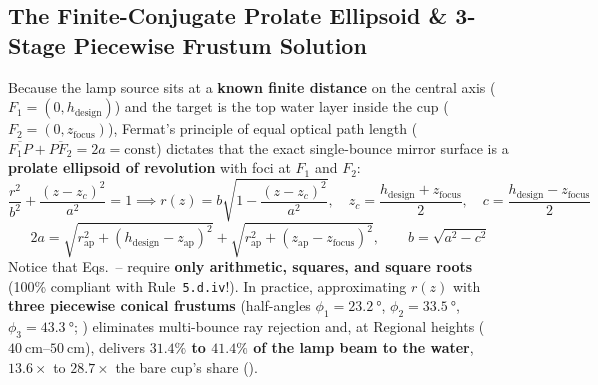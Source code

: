 \subsection{The Finite-Conjugate Prolate Ellipsoid \& 3-Stage Piecewise Frustum Solution}
Because the lamp source sits at a \textbf{known finite distance} on the central axis ($F_1 = (0, h_{\mathrm{design}})$) and the target is the top water layer inside the cup ($F_2 = (0, z_{\mathrm{focus}})$), Fermat's principle of equal optical path length ($\overline{F_1 P} + \overline{P F_2} = 2a = \mathrm{const}$) dictates that the exact single-bounce mirror surface is a \textbf{prolate ellipsoid of revolution} with foci at $F_1$ and $F_2$:
\begin{equation}\label{eq:15:ellipsoid}
  \frac{r^2}{b^2} + \frac{(z - z_c)^2}{a^2} = 1 \implies r(z) = b\sqrt{1 - \frac{(z - z_c)^2}{a^2}}, \quad z_c = \frac{h_{\mathrm{design}} + z_{\mathrm{focus}}}{2}, \quad c = \frac{h_{\mathrm{design}} - z_{\mathrm{focus}}}{2}
\end{equation}
\begin{equation}\label{eq:15:ellipsoid-ab}
  2a = \sqrt{r_{\mathrm{ap}}^2 + (h_{\mathrm{design}} - z_{\mathrm{ap}})^2} + \sqrt{r_{\mathrm{ap}}^2 + (z_{\mathrm{ap}} - z_{\mathrm{focus}})^2}, \qquad b = \sqrt{a^2 - c^2}
\end{equation}
Notice that Eqs.~-- require \textbf{only arithmetic, squares, and square roots} (100\% compliant with Rule~\texttt{5.d.iv}!). In practice, approximating $r(z)$ with \textbf{three piecewise conical frustums} (half-angles $\phi_1 = \SI{23.2}{\degree}$, $\phi_2 = \SI{33.5}{\degree}$, $\phi_3 = \SI{43.3}{\degree}$; ) eliminates multi-bounce ray rejection and, at Regional heights ($\SIrange{40}{50}{\centi\meter}$), delivers \textbf{$31.4\%$ to $41.4\%$ of the lamp beam to the water}, $13.6\times$ to $28.7\times$ the bare cup's share ().

